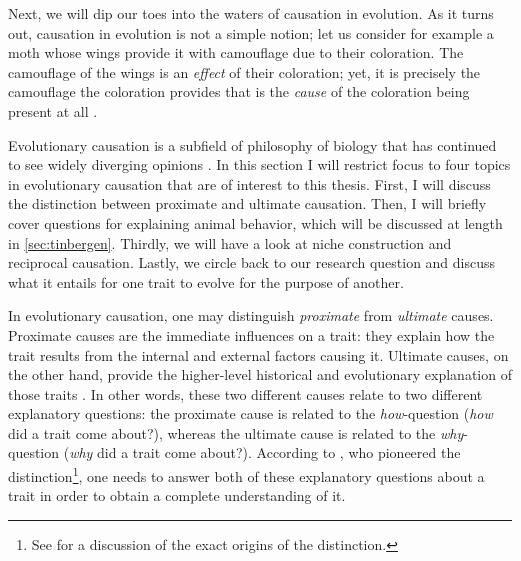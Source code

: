 Next, we will dip our toes into the waters of causation in evolution. As it turns out, causation in evolution is not a simple notion; let us consider for example a moth whose wings provide it with camouflage due to their coloration. The camouflage of the wings is an \emph{effect} of their coloration; yet, it is precisely the camouflage the coloration provides that is the \emph{cause} of the coloration being present at all \citep{Lipton09}.

Evolutionary causation is a subfield of philosophy of biology that has continued to see widely diverging opinions \citep{Baedke2021, S-P13}. In this section I will restrict focus to four topics in evolutionary causation that are of interest to this thesis. First, I will discuss the distinction between proximate and ultimate causation. Then, I will briefly cover  questions for explaining animal behavior, which will be discussed at length in \cref{sec:tinbergen}. Thirdly, we will have a look at niche construction and reciprocal causation. Lastly, we circle back to our research question and discuss what it entails for one trait to evolve for the purpose of another.

In evolutionary causation, one may distinguish \emph{proximate} from \emph{ultimate} causes.
Proximate causes are the immediate influences on a trait: they explain how the trait results from the internal and external factors causing it.
Ultimate causes, on the other hand, provide the higher-level historical and evolutionary explanation of those traits \citep{Mayr61}. In other words, these two different causes relate to two different explanatory questions: the proximate cause is related to the \emph{how}-question (\emph{how} did a trait come about?), whereas the ultimate cause is related to the \emph{why}-question (\emph{why} did a trait come about?). According to \citet{Mayr61}, who pioneered the distinction\footnote{See \citep{Laland13} for a discussion of the exact origins of the distinction.}, one needs to answer both of these explanatory questions about a trait in order to obtain a complete understanding of it.

